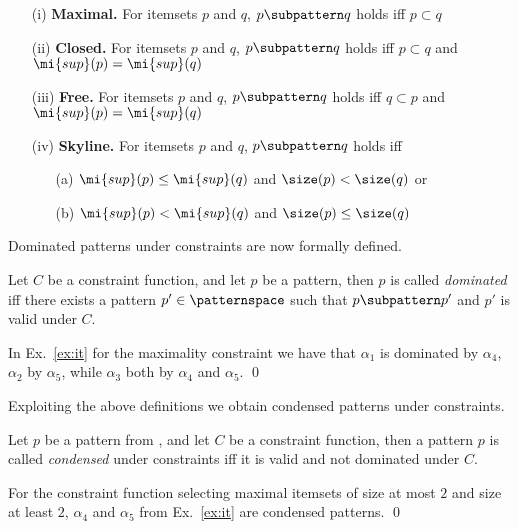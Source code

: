 \begin{itemize}
    \item[(i)] \textbf{Maximal.} For itemsets $p$ and $q$, $p \subpattern q$ holds iff $p \subset q$
    \item[(ii)] \textbf{Closed.} For itemsets $p$ and $q$, $p \subpattern q$ holds iff $p \subset q$ and  $\mi{sup}(p) = \mi{sup}(q)$ 
    \item[(iii)] \textbf{Free.} For itemsets $p$ and $q$, $p \subpattern q$ holds iff $q \subset p$ and $\mi{sup}(p) = \mi{sup}(q)$ 
    \item[(iv)] \textbf{Skyline.} For itemsets $p$ and $q$, $p \subpattern q$ holds iff 
        \begin{itemize}
            \item[(a)] $\mi{sup}(p) \leq \mi{sup}(q)$ and $\size(p) < \size(q)$ or 
            \item[(b)] $\mi{sup}(p) < \mi{sup}(q) $ and $\size(p) \leq \size(q)$
        \end{itemize}
\end{itemize}

Dominated patterns under constraints are now formally defined.

\begin{definition}\label{def:dom}
    Let $C$ be a constraint function, and let $p$ be a pattern, then $p$ is called \emph{dominated} iff there exists a pattern $p' \in \patternspace$ such that $p \subpattern p'$ and $p'$ is valid under $C$.
\end{definition}

\begin{example}
    In Ex.~\ref{ex:it} for the maximality constraint we have that $\alpha_1$ is dominated by $\alpha_4$, $\alpha_2$ by $\alpha_5$, while $\alpha_3$ both by $\alpha_4$ and $\alpha_5$. \qed
\end{example}

Exploiting the above definitions we obtain condensed patterns under constraints.

\begin{definition}\label{def:con}
    Let $p$ be a pattern from \patternspace, and let $C$ be a constraint function, then a pattern $p$ is called \emph{condensed} under constraints iff it is valid and not dominated under $C$. 
\end{definition}
 \begin{example}
     For the constraint function selecting maximal itemsets of size at most $2$ and %
     size at least $2$, $\alpha_4$ and $\alpha_5$ from Ex.~\ref{ex:it} are condensed patterns. \qed
 \end{example}

